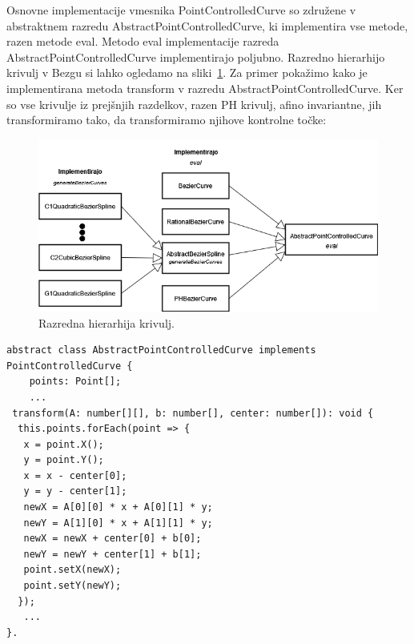 \documentclass[isrm2, tisk]{fmfdelo}
\begin{document}
    Osnovne implementacije vmesnika PointControlledCurve so združene v abstraktnem razredu AbstractPointControlledCurve, ki implementira vse metode, razen metode eval\@.
    Metodo eval implementacije razreda AbstractPointControlledCurve implementirajo poljubno.
    Razredno hierarhijo krivulj v Bezgu si lahko ogledamo na sliki~\ref{fig:hiearhija-krivulj}.
    Za primer pokažimo kako je implementirana metoda transform v razredu AbstractPointControlledCurve.
    Ker so vse krivulje iz prejšnjih razdelkov, razen PH krivulj, afino invariantne, jih transformiramo tako, da transformiramo njihove kontrolne točke:
    \begin{figure}[h!]
        \centering
        \includegraphics[width = \textwidth]{drawio/curve-class-hierarchy.drawio}
        \caption{Razredna hierarhija krivulj.}
        \label{fig:hiearhija-krivulj}
    \end{figure}
    \begin{lstlisting}[label={lst:affine-transform}]
abstract class AbstractPointControlledCurve implements PointControlledCurve {
    points: Point[];
    ...
 transform(A: number[][], b: number[], center: number[]): void {
  this.points.forEach(point => {
   x = point.X();
   y = point.Y();
   x = x - center[0];
   y = y - center[1];
   newX = A[0][0] * x + A[0][1] * y;
   newY = A[1][0] * x + A[1][1] * y;
   newX = newX + center[0] + b[0];
   newY = newY + center[1] + b[1];
   point.setX(newX);
   point.setY(newY);
  });
   ...
}.
    \end{lstlisting}
\end{document}
